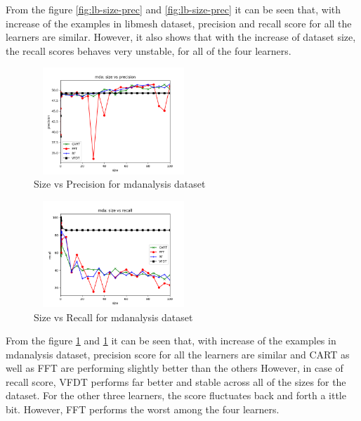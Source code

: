 \documentclass[sigplan]{acmart}\settopmatter{printfolios=true,printccs=false,printacmref=false}
\begin{document}
From the figure \ref{fig:lb-size-prec} and \ref{fig:lb-size-prec} it can be seen that, with increase of the examples in libmesh dataset, precision and recall score for all the learners are similar. However, it also shows that with the increase of dataset size, the recall scores behaves very unstable, for all of the four learners. 

\begin{figure}[h]
	\includegraphics[width=6cm,height=4cm,keepaspectratio]{fig/mda-size-precision.png}
	\caption{Size vs Precision for mdanalysis dataset}
	\label{fig:md-size-prec}
\end{figure}

\begin{figure}[h]
	\includegraphics[width=6cm,height=4cm,keepaspectratio]{fig/mda-size-recall.png}
	\caption{Size vs Recall for mdanalysis dataset}
	\label{fig:md-size-rec}
\end{figure}

From the figure \ref{fig:md-size-prec} and \ref{fig:md-size-prec} it can be seen that, with increase of the examples in mdanalysis dataset, precision score for all the learners are similar and CART as well as FFT are performing slightly better than the others However, in case of recall score, VFDT performs far better and stable across all of the sizes for the dataset. For the other three learners, the score fluctuates back and forth a ittle bit. However, FFT performs the worst among the four learners. 
\end{document}
